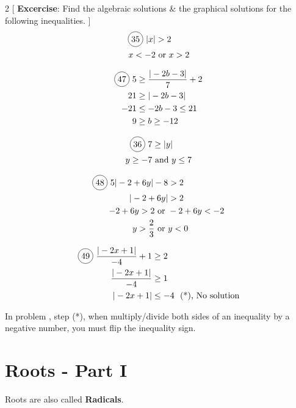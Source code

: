 \begin{multicols}{2}
[
  \textbf{Excercise}: Find the algebraic solutions \& the graphical solutions for the following inequalities.
]
\begin{align*}
  \circled{35}\ |x|&>2 \\
  x<-2 &\text{ or } x>2
\end{align*}


\begin{align*}
  \circled{47}\ 5&\geq \frac{|-2b-3|}{7}+2\\
  21&\geq |-2b-3| \\
  -21&\leq -2b-3 \leq 21\\
  9 &\geq b \geq -12
\end{align*}

\begin{align*}
  \circled{36}\ 7 &\geq |y|\\
  y \geq -7 &\text{ and } y \leq 7
\end{align*}

\begin{align*}
  \circled{48}\ 5|-2+6y|-8 &> 2\\
  |-2+6y|&>2\\
  -2+6y>2 \text{ or }& -2+6y<-2\\
  y>\frac{2}{3} \text{ or }& y<0
\end{align*}

\begin{align*}
  \circled{49}\ \frac{|-2x+1|}{-4}+1&\geq 2\\
  \frac{|-2x+1|}{-4}&\geq 1\\
  |-2x+1|&\leq -4\ \text{ (*), No solution}\\
\end{align*}

\end{multicols}

In problem , step (*), when multiply/divide both sides of an inequality by a negative number, you must flip the inequality sign.

\section{Roots - Part I}

Roots are also called \textbf{Radicals}.

